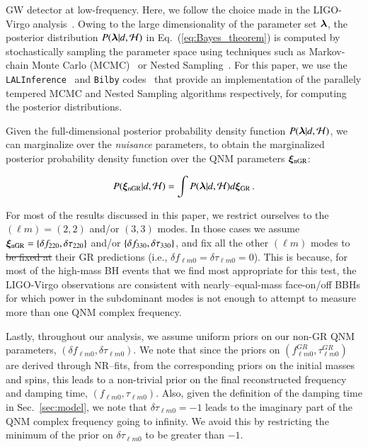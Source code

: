 GW detector at low-frequency. Here, we follow the choice made in the LIGO-Virgo analysis~\cite{LIGOScientific:2018mvr,Abbott:2020niy}. Owing to the large dimensionality of the parameter set $\bm{\lambda}$, the posterior distribution $P(\bm{\lambda} | d, \mathcal{H})$ in Eq.~(\ref{eq:Bayes_theorem}) is computed by stochastically sampling the parameter space using techniques such as Markov-chain Monte Carlo (MCMC)~\cite{Metropolis:1953am,Hastings:1970aa} or Nested Sampling~\cite{Skilling:2006gxv}. For this paper, we use the \verb+LALInference+~\cite{Veitch:2014wba} and \verb+Bilby+ codes~\cite{Ashton:2018jfp,Smith:2019ucc} that provide an implementation of the parallely tempered MCMC and Nested Sampling algorithms respectively, for computing the posterior distributions.

Given the full-dimensional posterior probability density function $P(\bm{\lambda} | d, \mathcal{H})$, we can marginalize over the \emph{nuisance} parameters, to obtain the marginalized posterior probability density function over the QNM parameters $\bm{\xi}_{\text{nGR}}$:

\begin{equation}
P(\bm{\xi}_{\text{nGR}} | d, \mathcal{H})= \int P(\bm{\lambda} | d, \mathcal{H}) d\bm{\xi}_{\text{GR}}\,.
\end{equation}

For most of the results discussed in this paper, we restrict ourselves
to the $(\ell m) = (2,2)$ and/or $(3,3)$ modes. In those cases we assume $\bm{\xi}_{\text{nGR}} = \{\delta f_{\text{220}},\delta \tau_{\text{220}}\}$ and/or $
\{\delta f_{\text{330}},\delta \tau_{\text{330}}\}$, and fix all the other $(\ell m)$ modes to \sout{be
fixed at} their GR predictions (i.e., $\delta f_{\ell m 0} = \delta
\tau_{\ell m 0} = 0$). This is because, for most of the high-mass BH
events that we find most appropriate for this test, the LIGO-Virgo
observations are consistent with nearly--equal-mass face-on/off BBHs
for which power in the subdominant modes is not enough to
attempt to measure more than one QNM complex frequency.

Lastly, throughout our analysis, we assume uniform priors on our non-GR QNM
parameters, $(\delta f_{\ell m 0},\delta \tau_{\ell m 0})$. We note that
since the priors on $( f_{\ell m 0}^{GR},\tau_{\ell m 0}^{GR})$ are
derived through NR--fits, from the corresponding priors on the initial
masses and spins, this leads to a non-trivial prior on the final
reconstructed frequency and damping time, $( f_{\ell m 0},\tau_{\ell m
  0})$. Also, given the definition of the damping time in
Sec.~\ref{sec:model}, we note that $\delta \tau_{\ell m 0} = -1$ leads
to the imaginary part of the QNM complex frequency going to infinity. We avoid
this by restricting the minimum of the prior on $\delta \tau_{\ell m
  0}$ to be greater than $-1$.

